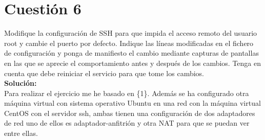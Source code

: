 \documentclass[a4paper, 11pt]{article} %
\begin{document}
\section{Cuestión 6}
Modifique la configuración de SSH para que impida el acceso remoto del usuario root y cambie el puerto por defecto. Indique las líneas modificadas en el fichero de configuración y ponga de manifiesto el cambio mediante capturas de pantallas en las que se aprecie el comportamiento antes y después de los cambios. Tenga en cuenta que debe reiniciar el servicio para que tome los cambios.\\
\textbf{Solución:}\\
Para realizar el ejercicio me he basado en \{1\}. Además se ha configurado otra máquina virtual con sistema operativo Ubuntu en una red con la máquina virtual CentOS con el servidor ssh, ambas tienen una configuración de dos adaptadores de red uno de ellos es adaptador-anfitrión y otra NAT para que se puedan ver entre ellas.\\
\end{document}
